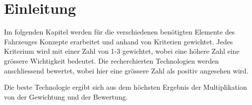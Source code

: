 \section{Einleitung}

Im folgenden Kapitel werden für die verschiedenen benötigten Elemente des Fahrzeuges Konzepte erarbeitet und anhand von Kriterien gewichtet. Jedes Kriterium wird mit einer Zahl von 1-3 gewichtet, wobei eine höhere Zahl eine grössere Wichtigkeit bedeutet. Die recherchierten Technologien werden anschliessend bewertet, wobei hier eine grössere Zahl als positiv angesehen wird.

Die beste Technologie ergibt sich aus dem höchsten Ergebnis der Multiplikation von der Gewichtung und der Bewertung.